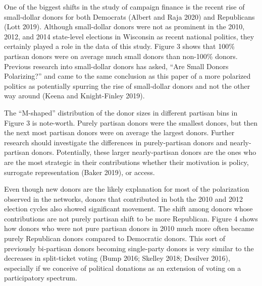 \documentclass[12pt,]{article}
\begin{document}
One of the biggest shifts in the study of campaign finance is the recent
rise of small-dollar donors for both Democrats (Albert and Raja 2020)
and Republicans (Lott 2019). Although small-dollar donors were not as
prominent in the 2010, 2012, and 2014 state-level elections in Wisconsin
as recent national politics, they certainly played a role in the data of
this study. Figure 3 shows that 100\% partisan donors were on average
much small donors than non-100\% donors. Previous research into
small-dollar donors has asked, ``Are Small Donors Polarizing?'' and came
to the same conclusion as this paper of a more polarized politics as
potentially spurring the rise of small-dollar donors and not the other
way around (Keena and Knight-Finley 2019).

The ``M-shaped'' distribution of the donor sizes in different partisan
bins in Figure 3 is note-worth. Purely partisan donors were the smallest
donors, but then the next most partisan donors were on average the
largest donors. Further research should investigate the differences in
purely-partisan donors and nearly-partisan donors. Potentially, these
larger nearly-partisan donors are the ones who are the most strategic in
their contributions whether their motivation is policy, surrogate
representation (Baker 2019), or access.

Even though new donors are the likely explanation for most of the
polarization observed in the networks, donors that contributed in both
the 2010 and 2012 election cycles also showed significant movement. The
shift among donors whose contributions are not purely partisan shift to
be more Republican. Figure 4 shows how donors who were not pure partisan
donors in 2010 much more often became purely Republican donors compared
to Democratic donors. This sort of previously bi-partisan donors
becoming single-party donors is very similar to the decreases in
split-ticket voting (Bump 2016; Skelley 2018; Desilver 2016), especially
if we conceive of political donations as an extension of voting on a
participatory spectrum.
\end{document}
